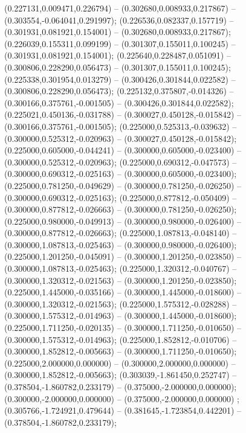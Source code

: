  (0.227131,0.009471,0.226794) -- (0.302680,0.008933,0.217867) -- (0.303554,-0.064041,0.291997);
 (0.226536,0.082337,0.157719) -- (0.301931,0.081921,0.154001) -- (0.302680,0.008933,0.217867);
 (0.226039,0.155311,0.099199) -- (0.301307,0.155011,0.100245) -- (0.301931,0.081921,0.154001);
 (0.225640,0.228487,0.051091) -- (0.300806,0.228290,0.056473) -- (0.301307,0.155011,0.100245);
 (0.225338,0.301954,0.013279) -- (0.300426,0.301844,0.022582) -- (0.300806,0.228290,0.056473);
 (0.225132,0.375807,-0.014326) -- (0.300166,0.375761,-0.001505) -- (0.300426,0.301844,0.022582);
 (0.225021,0.450136,-0.031788) -- (0.300027,0.450128,-0.015842) -- (0.300166,0.375761,-0.001505);
 (0.225000,0.525313,-0.039632) -- (0.300000,0.525312,-0.020963) -- (0.300027,0.450128,-0.015842);
 (0.225000,0.605000,-0.044241) -- (0.300000,0.605000,-0.023400) -- (0.300000,0.525312,-0.020963);
 (0.225000,0.690312,-0.047573) -- (0.300000,0.690312,-0.025163) -- (0.300000,0.605000,-0.023400);
 (0.225000,0.781250,-0.049629) -- (0.300000,0.781250,-0.026250) -- (0.300000,0.690312,-0.025163);
 (0.225000,0.877812,-0.050409) -- (0.300000,0.877812,-0.026663) -- (0.300000,0.781250,-0.026250);
 (0.225000,0.980000,-0.049913) -- (0.300000,0.980000,-0.026400) -- (0.300000,0.877812,-0.026663);
 (0.225000,1.087813,-0.048140) -- (0.300000,1.087813,-0.025463) -- (0.300000,0.980000,-0.026400);
 (0.225000,1.201250,-0.045091) -- (0.300000,1.201250,-0.023850) -- (0.300000,1.087813,-0.025463);
 (0.225000,1.320312,-0.040767) -- (0.300000,1.320312,-0.021563) -- (0.300000,1.201250,-0.023850);
 (0.225000,1.445000,-0.035166) -- (0.300000,1.445000,-0.018600) -- (0.300000,1.320312,-0.021563);
 (0.225000,1.575312,-0.028288) -- (0.300000,1.575312,-0.014963) -- (0.300000,1.445000,-0.018600);
 (0.225000,1.711250,-0.020135) -- (0.300000,1.711250,-0.010650) -- (0.300000,1.575312,-0.014963);
 (0.225000,1.852812,-0.010706) -- (0.300000,1.852812,-0.005663) -- (0.300000,1.711250,-0.010650);
 (0.225000,2.000000,0.000000) -- (0.300000,2.000000,0.000000) -- (0.300000,1.852812,-0.005663);
 (0.303039,-1.861450,0.252747) -- (0.378504,-1.860782,0.233179) -- (0.375000,-2.000000,0.000000);
 (0.300000,-2.000000,0.000000) -- (0.375000,-2.000000,0.000000) ;
 (0.305766,-1.724921,0.479644) -- (0.381645,-1.723854,0.442201) -- (0.378504,-1.860782,0.233179);
